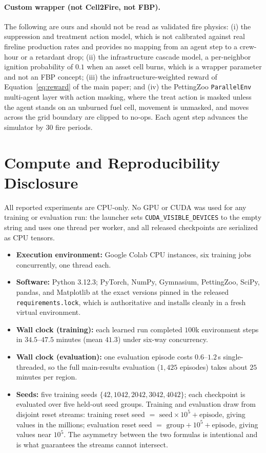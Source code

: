 \documentclass[letterpaper]{article}
\begin{document}
\paragraph{Custom wrapper (not Cell2Fire, not FBP).} The following are ours and should not be read as validated fire physics: (i) the suppression and treatment action model, which is not calibrated against real fireline production rates and provides no mapping from an agent step to a crew-hour or a retardant drop; (ii) the infrastructure cascade model, a per-neighbor ignition probability of $0.1$ when an asset cell burns, which is a wrapper parameter and not an FBP concept; (iii) the infrastructure-weighted reward of Equation~\ref{eq:reward} of the main paper; and (iv) the PettingZoo \texttt{ParallelEnv}~\citep{terry2021pettingzoo} multi-agent layer with action masking, where the treat action is masked unless the agent stands on an unburned fuel cell, movement is unmasked, and moves across the grid boundary are clipped to no-ops. Each agent step advances the simulator by $30$ fire periods.

\section{Compute and Reproducibility Disclosure}
\label{app:compute}

All reported experiments are CPU-only. No GPU or CUDA was used for any training or evaluation run: the launcher sets \texttt{CUDA\_VISIBLE\_DEVICES} to the empty string and uses one thread per worker, and all released checkpoints are serialized as CPU tensors.

\begin{itemize}\itemsep1pt
	\item \textbf{Execution environment:} Google Colab CPU instances, six training jobs concurrently, one thread each.
	\item \textbf{Software:} Python 3.12.3; PyTorch, NumPy, Gymnasium, PettingZoo, SciPy, pandas, and Matplotlib at the exact versions pinned in the released \texttt{requirements.lock}, which is authoritative and installs cleanly in a fresh virtual environment.
	\item \textbf{Wall clock (training):} each learned run completed $100$k environment steps in $34.5$--$47.5$ minutes (mean $41.3$) under six-way concurrency.
	\item \textbf{Wall clock (evaluation):} one evaluation episode costs $0.6$--$1.2$\,s single-threaded, so the full main-results evaluation ($1{,}425$ episodes) takes about $25$ minutes per region.
	\item \textbf{Seeds:} five training seeds $\{42, 1042, 2042, 3042, 4042\}$; each checkpoint is evaluated over five held-out seed groups. Training and evaluation draw from disjoint reset streams: training reset seed $=$ $\text{seed} \times 10^5 + \text{episode}$, giving values in the millions; evaluation reset seed $=$ $\text{group} + 10^5 + \text{episode}$, giving values near $10^5$. The asymmetry between the two formulas is intentional and is what guarantees the streams cannot intersect.
\end{itemize}
\end{document}
